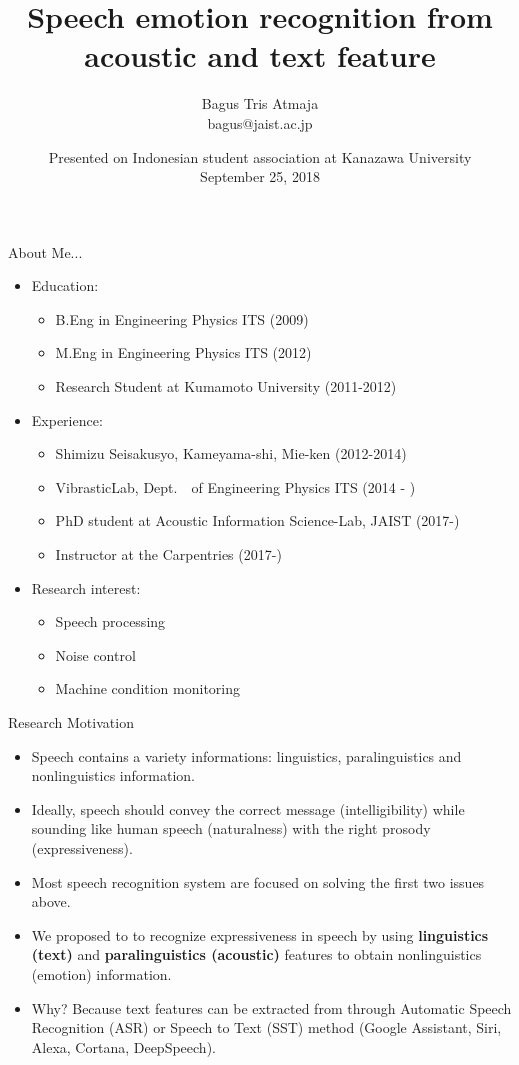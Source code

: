\documentclass[aspectratio=169]{beamer}
\author{Bagus Tris Atmaja \\ 
        bagus@jaist.ac.jp}
\title{\LARGE{Speech emotion recognition 
    \newline from acoustic and text feature }}
\institute{AIS-Lab \\ School of Information Science \\ JAIST}
\date{\tiny Presented on  Indonesian student association at Kanazawa University \\ September 25, 2018}
\begin{document}
\begin{frame}[t,plain]
\titlepage
\end{frame}

\begin{frame}[t, fragile]{About Me...}
\begin{itemize}
\item Education:
    \begin{itemize}
    \item B.Eng in Engineering Physics ITS (2009)
    \item M.Eng in Engineering Physics ITS (2012)
    \item Research Student at Kumamoto University (2011-2012)
    \end{itemize}
\item Experience:
    \begin{itemize}
    \item Shimizu Seisakusyo, Kameyama-shi, Mie-ken (2012-2014)
    \item VibrasticLab, Dept.　of Engineering Physics ITS (2014 - )
    \item PhD student at Acoustic Information Science-Lab, JAIST (2017-)
    \item Instructor at the Carpentries (2017-)
    \end{itemize}
\item Research interest:
    \begin{itemize}
    \item Speech processing
    \item Noise control
    \item Machine condition monitoring
    \end{itemize}
\end{itemize}
\end{frame}

\begin{frame}[t]{Research Motivation}
\begin{itemize}
  \item Speech contains a variety informations: linguistics, paralinguistics and
  		nonlinguistics information.
  \item Ideally, speech should convey the correct message (intelligibility) 
  while sounding like human speech (naturalness) with the right prosody (expressiveness).
  \item Most speech recognition system are focused on solving the first two 
  		issues above.
  \item We proposed to to recognize expressiveness in speech by using \textbf{linguistics (text)} 
  		and \textbf{paralinguistics (acoustic)} features to obtain nonlinguistics (emotion) information. 
  \item Why? Because text features can be extracted from through Automatic Speech Recognition
        (ASR) or Speech to Text (SST) method (Google Assistant, Siri, Alexa, Cortana, DeepSpeech).
  \end{itemize}
\end{frame}
\end{document}
